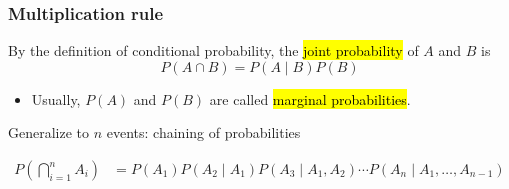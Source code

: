 \documentclass[slidestop,compress,mathserif]{beamer}
\begin{document}
\begin{frame}\frametitle{Multiplication rule}


\begin{dinglist}{\DingListSymbolA}
\item By the definition of conditional probability, the \hl{joint probability} of $A$ and $B$ is
\[ P(A \cap B) = P(A \mid B)P(B) \]
  \begin{itemize}
  \item Usually, $P(A)$ and $P(B)$ are called \hl{marginal probabilities}.
  \end{itemize}

\vspace{0.5cm}
\pause
\item Generalize to $n$ events: chaining of probabilities
\end{dinglist}
\begin{align*}
P\left(\bigcap_{i=1}^n A_i\right)
	& = P(A_1) P(A_2 \mid A_1) P(A_3 \mid  A_1, A_2) \cdots P(A_n  \mid  A_1,\ldots,A_{n-1})\\
\end{align*}



\end{frame}
\end{document}
